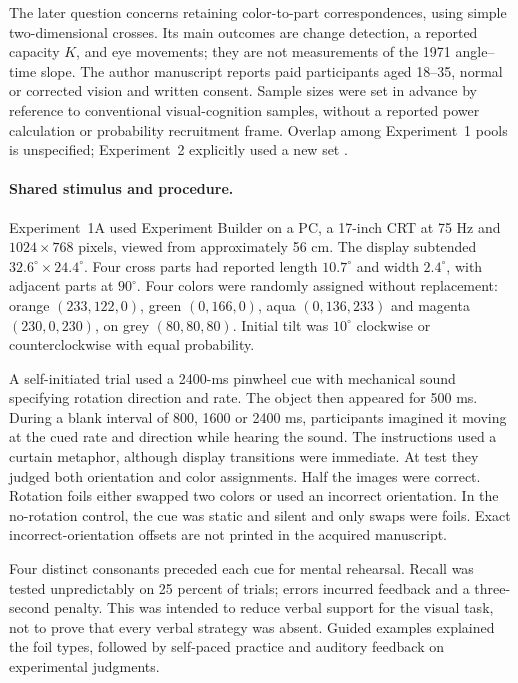 The later question concerns retaining color-to-part correspondences,
using simple two-dimensional crosses. Its main outcomes are
change detection, a reported capacity \(K\), and eye movements;
they are not measurements of the 1971 angle--time slope.
The author manuscript reports paid participants aged 18--35,
normal or corrected vision and written consent. Sample sizes
were set in advance by reference to conventional visual-cognition
samples, without a reported power calculation or probability
recruitment frame. Overlap among Experiment~1 pools is unspecified;
Experiment~2 explicitly used a new set
\cite[Experiments~1A--2]{XuFranconeri2015FeatureCapacity}.

\paragraph{Shared stimulus and procedure.}
Experiment~1A used Experiment Builder on a PC, a 17-inch CRT at
75 Hz and \(1024\times768\) pixels, viewed from approximately
56 cm. The display subtended \(32.6^\circ\times24.4^\circ\).
Four cross parts had reported length \(10.7^\circ\) and width
\(2.4^\circ\), with adjacent parts at \(90^\circ\).
Four colors were randomly assigned without replacement:
orange \((233,122,0)\), green \((0,166,0)\), aqua
\((0,136,233)\) and magenta \((230,0,230)\), on grey
\((80,80,80)\). Initial tilt was \(10^\circ\) clockwise or
counterclockwise with equal probability.

A self-initiated trial used a 2400-ms pinwheel cue with mechanical
sound specifying rotation direction and rate. The object then
appeared for 500 ms. During a blank interval of 800, 1600 or
2400 ms, participants imagined it moving at the cued rate and
direction while hearing the sound. The instructions used a
curtain metaphor, although display transitions were immediate.
At test they judged both orientation and color assignments.
Half the images were correct. Rotation foils either swapped
two colors or used an incorrect orientation. In the no-rotation
control, the cue was static and silent and only swaps were foils.
Exact incorrect-orientation offsets are not printed in the
acquired manuscript.

Four distinct consonants preceded each cue for mental rehearsal.
Recall was tested unpredictably on 25 percent of trials;
errors incurred feedback and a three-second penalty.
This was intended to reduce verbal support for the visual task,
not to prove that every verbal strategy was absent.
Guided examples explained the foil types, followed by self-paced
practice and auditory feedback on experimental judgments.

